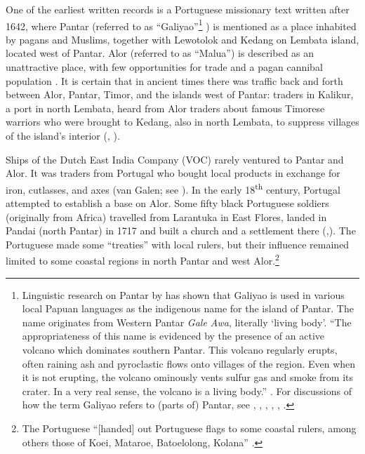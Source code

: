 One of the earliest written records is a Portuguese missionary text written after 1642, where Pantar (referred to as ``Galiyao''\footnote{Linguistic
 research on Pantar by \citet{Holton2010galiyao} has shown that Galiyao is used in various local Papuan languages as the indigenous name for the island of Pantar. The name originates from Western Pantar \textit{Gale Awa}, literally `living body'. ``The appropriateness of this name is evidenced by the presence of an active volcano which dominates southern Pantar. This volcano regularly erupts, often raining ash and pyroclastic flows onto villages of the region. Even when it is not erupting, the volcano ominously vents sulfur gas and smoke from its crater. In a very real sense, the volcano is a living body.'' \citep{Holton2010galiyao}. 
 For discussions of how the term Galiyao refers to (parts of) Pantar, see \citet[47]{LeRoux1929}, \citet[407]{Barnes1982majapahit}, \citet{Dietrich1984}, \citet{Rodemeier1995}, \citet[277]{Barnes2001}, \citet{Rodemeier2006}.
}
) is mentioned as a place inhabited by pagans and Muslims, together with Lewotolok and Kedang on Lembata island, located west of Pantar. Alor (referred to as ``Malua'') is described as an unattractive place, with few opportunities for trade and a pagan cannibal population \citep[101]{Hagerdal2012}. It is certain that in ancient times there was traffic back and forth between Alor, Pantar, Timor, and the islands west of Pantar: traders in Kalikur, a port in north Lembata, heard from Alor traders about famous Timorese warriors who were brought to Kedang, also in north Lembata, to suppress villages of the island's interior (\citealt[10.12]{Barnes1974}, \citealt[14]{LeRoux1929}). 

Ships of the Dutch East India Company (VOC) rarely ventured to Pantar and Alor. It was traders from Portugal who bought local products in exchange for iron, cutlasses, and axes (van Galen; see \citealt[17]{Hagerdal2010galens1}). In the early 18\textsuperscript{th} century, Portugal attempted to establish a base on Alor. Some fifty black Portuguese soldiers (originally from Africa) travelled from Larantuka in East Flores, landed in Pandai (north Pantar) in 1717 and built a church and a settlement there (\citealt[297]{Coolhaas1979},\citealt[78]{Rodemeier2006}). The Portuguese made some ``treaties'' with local rulers, but their influence remained limited to some coastal regions in north Pantar and west Alor.\footnote{The Portuguese ``[handed] out Portuguese flags to some coastal rulers, among others those of Koei, Mataroe, Batoelolong, Kolana'' \citep[2]{VanGaalen1945}.} 

